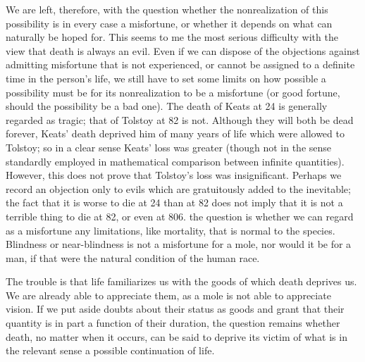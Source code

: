 We are left, therefore, with the question whether the nonrealization of this
possibility is in every case a misfortune, or whether it depends on what can
naturally be hoped for. This seems to me the most serious difficulty with the
view that death is always an evil. Even if we can dispose of the objections
against admitting misfortune that is not experienced, or cannot be assigned to
a definite time in the person's life, we still have to set some limits on how
possible a possibility must be for its nonrealization to be a misfortune (or good
fortune, should the possibility be a bad one). The death of Keats at 24 is
generally regarded as tragic; that of Tolstoy at 82 is not. Although they will both
be dead forever, Keats' death deprived him of many years of life which were
allowed to Tolstoy; so in a clear sense Keats' loss was greater (though not in
the sense standardly employed in mathematical comparison between infinite
quantities). However, this does not prove that Tolstoy's loss was insignificant.
Perhaps we record an objection only to evils which are gratuitously added to
the inevitable; the fact that it is worse to die at 24 than at 82 does not imply that
it is not a terrible thing to die at 82, or even at 806. the question is whether we
can regard as a misfortune any limitations, like mortality, that is normal to the
species. Blindness or near-blindness is not a misfortune for a mole, nor would
it be for a man, if that were the natural condition of the human race.

The trouble is that life familiarizes us with the goods of which death deprives
us. We are already able to appreciate them, as a mole is not able to appreciate
vision. If we put aside doubts about their status as goods and grant that their
quantity is in part a function of their duration, the question remains whether
death, no matter when it occurs, can be said to deprive its victim of what is in
the relevant sense a possible continuation of life.

